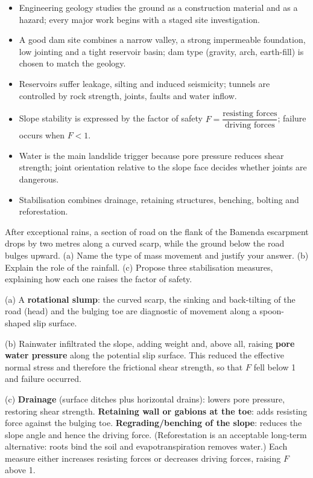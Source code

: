 \documentclass[11pt]{article}
\begin{document}
\begin{aretenir}
\begin{itemize}
\item Engineering geology studies the ground as a construction material and as a hazard; every major work begins with a staged site investigation.
\item A good dam site combines a narrow valley, a strong impermeable foundation, low jointing and a tight reservoir basin; dam type (gravity, arch, earth-fill) is chosen to match the geology.
\item Reservoirs suffer leakage, silting and induced seismicity; tunnels are controlled by rock strength, joints, faults and water inflow.
\item Slope stability is expressed by the factor of safety $F = \dfrac{\text{resisting forces}}{\text{driving forces}}$; failure occurs when $F < 1$.
\item Water is the main landslide trigger because pore pressure reduces shear strength; joint orientation relative to the slope face decides whether joints are dangerous.
\item Stabilisation combines drainage, retaining structures, benching, bolting and reforestation.
\end{itemize}
\end{aretenir}

\begin{exercice}
After exceptional rains, a section of road on the flank of the Bamenda escarpment drops by two metres along a curved scarp, while the ground below the road bulges upward. (a) Name the type of mass movement and justify your answer. (b) Explain the role of the rainfall. (c) Propose three stabilisation measures, explaining how each one raises the factor of safety.
\end{exercice}

\begin{corrige}[Exercise 1]
(a) A \textbf{rotational slump}: the curved scarp, the sinking and back-tilting of the road (head) and the bulging toe are diagnostic of movement along a spoon-shaped slip surface.

(b) Rainwater infiltrated the slope, adding weight and, above all, raising \textbf{pore water pressure} along the potential slip surface. This reduced the effective normal stress and therefore the frictional shear strength, so that $F$ fell below 1 and failure occurred.

(c) \textbf{Drainage} (surface ditches plus horizontal drains): lowers pore pressure, restoring shear strength. \textbf{Retaining wall or gabions at the toe}: adds resisting force against the bulging toe. \textbf{Regrading/benching of the slope}: reduces the slope angle and hence the driving force. (Reforestation is an acceptable long-term alternative: roots bind the soil and evapotranspiration removes water.) Each measure either increases resisting forces or decreases driving forces, raising $F$ above 1.
\end{corrige}
\end{document}
